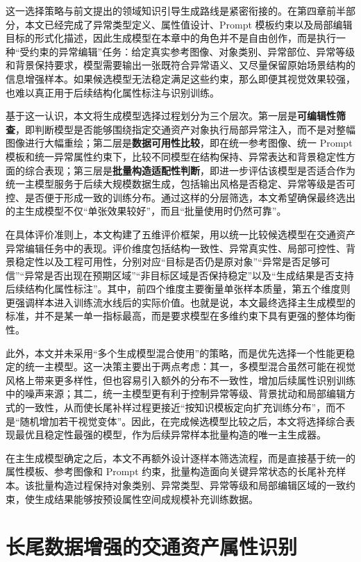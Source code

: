 这一选择策略与前文提出的领域知识引导生成路线是紧密衔接的。在第四章前半部分，本文已经完成了异常类型定义、属性值设计、Prompt 模板约束以及局部编辑目标的形式化描述，因此生成模型在本章中的角色并不是自由创作，而是执行一种“受约束的异常编辑”任务：给定真实参考图像、对象类别、异常部位、异常等级和背景保持要求，模型需要输出一张既符合异常语义、又尽量保留原始场景结构的信息增强样本。如果候选模型无法稳定满足这些约束，那么即便其视觉效果较强，也难以真正用于后续结构化属性标注与识别训练。

基于这一认识，本文将生成模型选择过程划分为三个层次。第一层是\textbf{可编辑性筛查}，即判断模型是否能够围绕指定交通资产对象执行局部异常注入，而不是对整幅图像进行大幅重绘；第二层是\textbf{数据可用性比较}，即在统一参考图像、统一 Prompt 模板和统一异常属性约束下，比较不同模型在结构保持、异常表达和背景稳定性方面的综合表现；第三层是\textbf{批量构造适配性判断}，即进一步评估该模型是否适合作为统一主模型服务于后续大规模数据生成，包括输出风格是否稳定、异常等级是否可控、是否便于形成一致的训练分布。通过这样的分层筛选，本文希望确保最终选出的主生成模型不仅“单张效果较好”，而且“批量使用时仍然可靠”。

在具体评价准则上，本文构建了五维评价框架，用以统一比较候选模型在交通资产异常编辑任务中的表现。评价维度包括结构一致性、异常真实性、局部可控性、背景稳定性以及工程可用性，分别对应“目标是否仍是原对象”“异常是否足够可信”“异常是否出现在预期区域”“非目标区域是否保持稳定”以及“生成结果是否支持后续结构化属性标注”。其中，前四个维度主要衡量单张样本质量，第五个维度则更强调样本进入训练流水线后的实际价值。也就是说，本文最终选择主生成模型的标准，并不是某一单一指标最高，而是要求模型在多维约束下具有更强的整体均衡性。

此外，本文并未采用“多个生成模型混合使用”的策略，而是优先选择一个性能更稳定的统一主模型。这一决策主要出于两点考虑：其一，多模型混合虽然可能在视觉风格上带来更多样性，但也容易引入额外的分布不一致性，增加后续属性识别训练中的噪声来源；其二，统一主模型更有利于控制异常等级、背景扰动和局部编辑方式的一致性，从而使长尾补样过程更接近“按知识模板定向扩充训练分布”，而不是“随机增加若干视觉变体”。因此，在完成候选模型比较之后，本文将选择综合表现最优且稳定性最强的模型，作为后续异常样本批量构造的唯一主生成器。

在主生成模型确定之后，本文不再额外设计逐样本筛选流程，而是直接基于统一的属性模板、参考图像和 Prompt 约束，批量构造面向关键异常状态的长尾补充样本。该批量构造过程保持对象类别、异常类型、异常等级和局部编辑区域的一致约束，使生成结果能够按预设属性空间成规模补充训练数据。

\section{长尾数据增强的交通资产属性识别}

